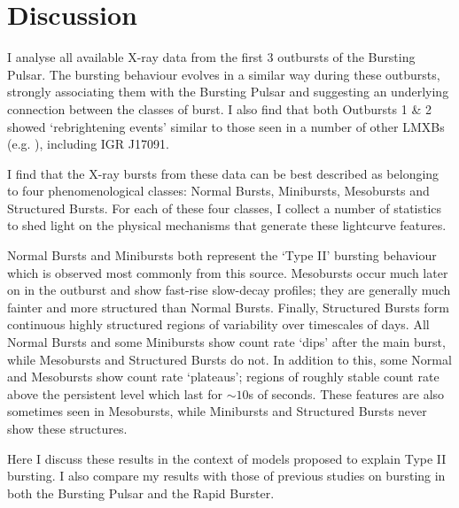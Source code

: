 \section{Discussion}

\par I analyse all available X-ray data from the first 3 outbursts of the Bursting Pulsar.  The bursting behaviour evolves in a similar way during these outbursts, strongly associating them with the Bursting Pulsar and suggesting an underlying connection between the classes of burst.  I also find that both Outbursts 1 \& 2 showed `rebrightening events' similar to those seen in a number of other LMXBs (e.g. \citealp{Wijnands_1808,Patruno_Reflares2}), including IGR J17091.
\par I find that the X-ray bursts from these data can be best described as belonging to four phenomenological classes: Normal Bursts, Minibursts, Mesobursts and Structured Bursts.  For each of these four classes, I collect a number of statistics to shed light on the physical mechanisms that generate these lightcurve features.
\par Normal Bursts and Minibursts both represent the `Type II' bursting behaviour which is observed most commonly from this source.   Mesobursts occur much later on in the outburst and show fast-rise slow-decay profiles; they are generally much fainter and more structured than Normal Bursts.  Finally, Structured Bursts form continuous highly structured regions of variability over timescales of days.  All Normal Bursts and some Minibursts show count rate `dips' after the main burst, while Mesobursts and Structured Bursts do not.  In addition to this, some Normal and Mesobursts show count rate `plateaus'; regions of roughly stable count rate above the persistent level which last for $\sim10$s of seconds.  These features are also sometimes seen in Mesobursts, while Minibursts and Structured Bursts never show these structures.
\par Here I discuss these results in the context of models proposed to explain Type II bursting.  I also compare my results with those of previous studies on bursting in both the Bursting Pulsar and the Rapid Burster.

